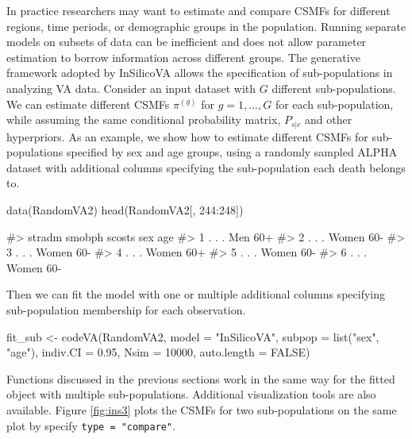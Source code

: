 In practice researchers may want to estimate and compare CSMFs for
different regions, time periods, or demographic groups in the
population. Running separate models on subsets of data can be
inefficient and does not allow parameter estimation to borrow
information across different groups. The generative framework adopted by
InSilicoVA allows the specification of sub-populations in analyzing VA
data. Consider an input dataset with \(G\) different sub-populations. We
can estimate different CSMFs \(\pi^{(g)}\) for \(g = 1, ..., G\) for
each sub-population, while assuming the same conditional probability
matrix, \(P_{s|c}\) and other hyperpriors. As an example, we show how to
estimate different CSMFs for sub-populations specified by sex and age
groups, using a randomly sampled ALPHA dataset with additional columns
specifying the sub-population each death belongs to.

\begin{Schunk}
\begin{Sinput}
data(RandomVA2)
head(RandomVA2[, 244:248])
\end{Sinput}
\begin{Soutput}
#>   stradm smobph scosts   sex age
#> 1      .      .      .   Men 60+
#> 2      .      .      . Women 60-
#> 3      .      .      . Women 60-
#> 4      .      .      . Women 60+
#> 5      .      .      . Women 60-
#> 6      .      .      . Women 60-
\end{Soutput}
\end{Schunk}

Then we can fit the model with one or multiple additional columns
specifying sub-population membership for each observation.

\begin{Schunk}
\begin{Sinput}
fit_sub <- codeVA(RandomVA2, model = "InSilicoVA", 
              subpop = list("sex", "age"),  indiv.CI = 0.95,
              Nsim = 10000, auto.length = FALSE)
\end{Sinput}
\end{Schunk}

Functions discussed in the previous sections work in the same way for
the fitted object with multiple sub-populations. Additional
visualization tools are also available. Figure \ref{fig:ins3} plots the
CSMFs for two sub-populations on the same plot by specify
\texttt{type\ =\ "compare"}.

